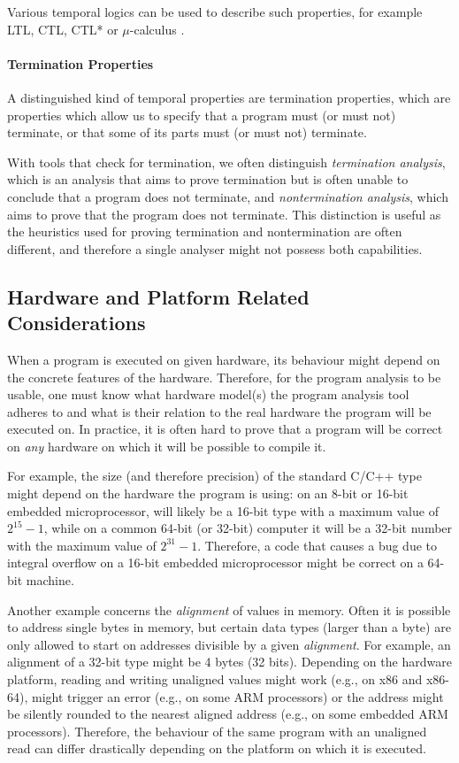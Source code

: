 Various temporal logics can be used to describe such properties, for example
LTL, CTL, CTL*  or $\mu$-calculus .

\paragraph{Termination Properties}
%
A distinguished kind of temporal properties are termination properties, which are properties which allow us to specify that a program must (or must not) terminate, or that some of its parts must (or must not) terminate.

With tools that check for termination, we often distinguish \emph{termination analysis}, which is an analysis that aims to prove termination but is often unable to conclude that a program does not terminate, and \emph{nontermination analysis}, which aims to prove that the program does not terminate.
This distinction is useful as the heuristics used for proving termination and nontermination are often different, and therefore a single analyser might not possess both capabilities.

\subsection{Hardware and Platform Related Considerations}

When a program is executed on given hardware, its behaviour might
depend on the concrete features of the hardware.
Therefore, for the program analysis to be usable, one must know what
hardware model(s) the program analysis tool adheres to and what is their
relation to the real hardware the program will be executed on.
In practice, it is often hard to prove that a program will be correct on
\emph{any} hardware on which it will be possible to compile it.

For example, the size (and therefore precision) of the standard C/C++ type
 might depend on the hardware the program is using: on an 8-bit or
16-bit embedded microprocessor,  will likely be a 16-bit type with a
maximum value of $2^{15} - 1$, while on a common 64-bit (or 32-bit) computer it
will be a 32-bit number with the maximum value of $2^{31}-1$.
Therefore, a code that causes a bug due to integral overflow on a 16-bit
embedded microprocessor might be correct on a 64-bit machine.

Another example concerns the \emph{alignment} of values in memory.
Often it is
possible to address single bytes in memory, but certain data types (larger
than a byte) are only allowed to start on addresses divisible by a given
\emph{alignment}.
For example, an alignment of a 32-bit  type might be 4 bytes (32
bits).
Depending on the hardware platform, reading and writing unaligned values might
work (e.g., on x86 and x86-64), might trigger an error (e.g., on some ARM
processors) or the address might be silently rounded to the nearest
aligned address (e.g., on some embedded ARM processors).
Therefore, the behaviour of the same program with an unaligned read can differ
drastically depending on the platform on which it is executed.

